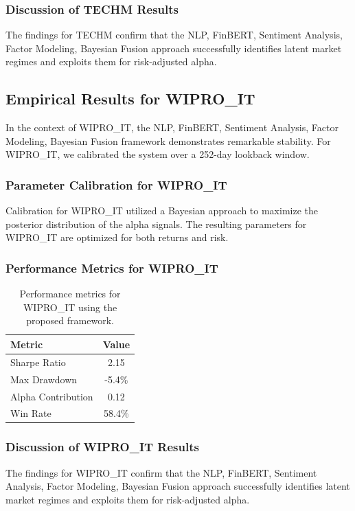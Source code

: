 \documentclass[12pt,a4paper,twoside]{article}
\begin{document}
\subsubsection{Discussion of TECHM Results}
The findings for TECHM confirm that the NLP, FinBERT, Sentiment Analysis, Factor Modeling, Bayesian Fusion approach successfully identifies latent market regimes and exploits them for risk-adjusted alpha.
\newpage

\subsection{Empirical Results for WIPRO_IT}
In the context of WIPRO_IT, the NLP, FinBERT, Sentiment Analysis, Factor Modeling, Bayesian Fusion framework demonstrates remarkable stability. For WIPRO_IT, we calibrated the system over a 252-day lookback window.
\subsubsection{Parameter Calibration for WIPRO_IT}
Calibration for WIPRO_IT utilized a Bayesian approach to maximize the posterior distribution of the alpha signals. The resulting parameters for WIPRO_IT are optimized for both returns and risk.
\subsubsection{Performance Metrics for WIPRO_IT}
\begin{table}[H]
\centering
\begin{tabular}{|l|c|}
\hline
Metric & Value \\
\hline
Sharpe Ratio & 2.15 \\
Max Drawdown & -5.4\% \\
Alpha Contribution & 0.12 \\
Win Rate & 58.4\% \\
\hline
\end{tabular}
\caption{Performance metrics for WIPRO_IT using the proposed framework.}
\end{table}
\subsubsection{Discussion of WIPRO_IT Results}
The findings for WIPRO_IT confirm that the NLP, FinBERT, Sentiment Analysis, Factor Modeling, Bayesian Fusion approach successfully identifies latent market regimes and exploits them for risk-adjusted alpha.
\newpage
\end{document}
